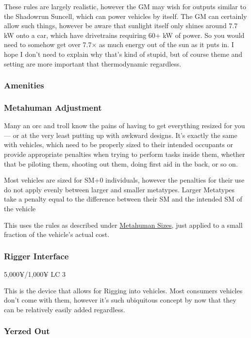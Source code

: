 \begin{multicols*}{2}
	These rules are largely realistic, however the GM may wish for outputs similar to the Shadowrun Suncell, which can power vehicles by itself. The GM can certainly allow such things, however be aware that sunlight itself only shines around 7.7 kW onto a car, which have drivetrains requiring 60+ kW of power. So you would need to somehow get over 7.7$\times$ as much energy out of the sun as it puts in. I hope I don't need to explain why that's kind of stupid, but of course theme and setting are more important that thermodynamic regardless.
	
	
	\subsubsection{Amenities}
	
	
	\subsubsection{Metahuman Adjustment}
	
	Many an orc and troll know the pains of having to get everything resized for you — or at the very least putting up with awkward designs. It's exactly the same with vehicles, which need to be properly sized to their intended occupants or provide appropriate penalties when trying to perform tasks inside them, whether that be piloting them, shooting out them, doing first aid in the back, or so on. 
	
	Most vehicles are sized for SM+0 individuals, however the penalties for their use do not apply evenly between larger and smaller metatypes. Larger Metatypes take a penalty equal to the difference between their SM and the intended SM of the vehicle
	
	This uses the rules as described under \hyperref[metatype_sizing]{Metahuman Sizes}, just applied to a small fraction of the vehicle's actual cost. 
	
	\subsubsection{Rigger Interface}
	5,000¥/1,000¥ LC 3
	
	This is the device that allows for Rigging into vehicles. Most consumers vehicles don't come with them, however it's such ubiquitous concept by now that they can be relatively easily added regardless.
	
	\subsubsection{Yerzed Out}
	

\end{multicols*}
